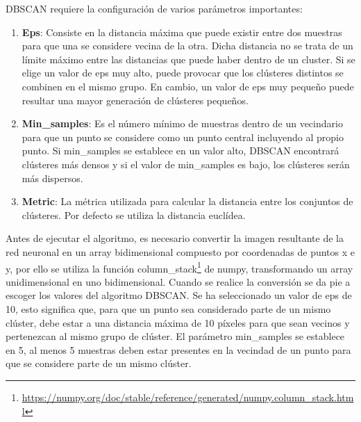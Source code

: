 DBSCAN requiere la configuración de varios parámetros importantes:
\begin{enumerate}
  \item \textbf{Eps}: Consiste en la distancia máxima que puede existir entre dos muestras para que una se considere vecina de la otra. Dicha distancia no se trata de un límite 
  máximo entre las distancias que puede haber dentro de un cluster. Si se elige un valor de eps muy alto, puede provocar que los clústeres distintos se combinen en el mismo grupo. 
  En cambio, un valor de eps muy pequeño puede resultar una mayor generación de clústeres pequeños.
  \item \textbf{Min\_samples}: Es el número mínimo de muestras dentro de un vecindario para que un punto se considere como un punto central incluyendo al propio punto.
  Si min\_samples se establece en un valor alto, DBSCAN encontrará clústeres más densos y 
  si el valor de min\_samples es bajo, los clústeres serán más dispersos.
  \item \textbf{Metric}: La métrica utilizada para calcular la distancia entre los conjuntos de clústeres. Por defecto se utiliza la distancia euclídea. 
\end{enumerate}

Antes de ejecutar el algoritmo, es necesario convertir la imagen resultante de la red neuronal en un array bidimensional compuesto por coordenadas de puntos x e y, por ello se utiliza
la función column\_stack\footnote{\url{https://numpy.org/doc/stable/reference/generated/numpy.column_stack.html}} de numpy, transformando un array
unidimensional en uno bidimensional. Cuando se realice la conversión se da pie a escoger los valores del algoritmo DBSCAN. Se ha seleccionado un valor de eps de 10, esto significa que, 
para que un punto sea considerado parte de un mismo clúster, debe estar a una distancia máxima de 10 píxeles para que sean vecinos y pertenezcan al mismo grupo de clúster. 
El parámetro min\_samples se establece en 5, al menos 5 muestras 
deben estar presentes en la vecindad de un punto para que se considere parte de un mismo clúster. 

